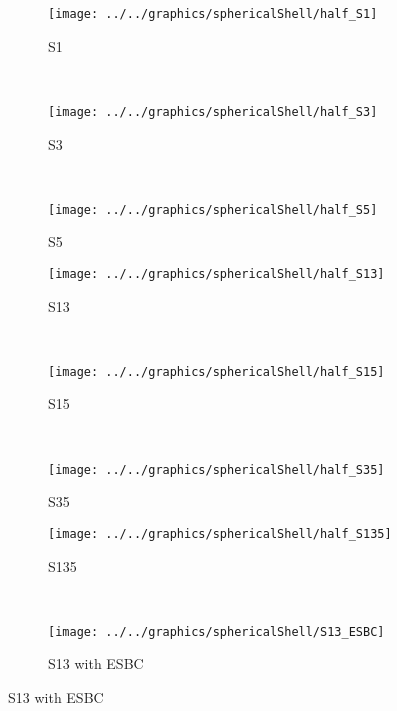 \begin{figure}
	\centering
	\begin{subfigure}{0.3\textwidth}
		\centering
		\texttt{[image: ../../graphics/sphericalShell/half\_S1]}
		\caption{S1}
    \end{subfigure}
	~
	\begin{subfigure}{0.3\textwidth}
		\centering
		\texttt{[image: ../../graphics/sphericalShell/half\_S3]}
		\caption{S3}
    \end{subfigure}
	~
	\begin{subfigure}{0.3\textwidth}
		\centering
		\texttt{[image: ../../graphics/sphericalShell/half\_S5]}
		\caption{S5}
    \end{subfigure}
	\par\bigskip
	\begin{subfigure}{0.3\textwidth}
		\centering
		\texttt{[image: ../../graphics/sphericalShell/half\_S13]}
		\caption{S13}
    \end{subfigure}
	~
	\begin{subfigure}{0.3\textwidth}
		\centering
		\texttt{[image: ../../graphics/sphericalShell/half\_S15]}
		\caption{S15}
    \end{subfigure}
	~
	\begin{subfigure}{0.3\textwidth}
		\centering
		\texttt{[image: ../../graphics/sphericalShell/half\_S35]}
		\caption{S35}
    \end{subfigure}
	\par\bigskip
	\begin{subfigure}{0.3\textwidth}
		\centering
		\texttt{[image: ../../graphics/sphericalShell/half\_S135]}
		\caption{S135}
    \end{subfigure}
	~
	\begin{subfigure}{0.3\textwidth}
		\centering
		\texttt{[image: ../../graphics/sphericalShell/S13\_ESBC]}
		\caption{S13 with ESBC}

\end{subfigure}
\end{figure}
